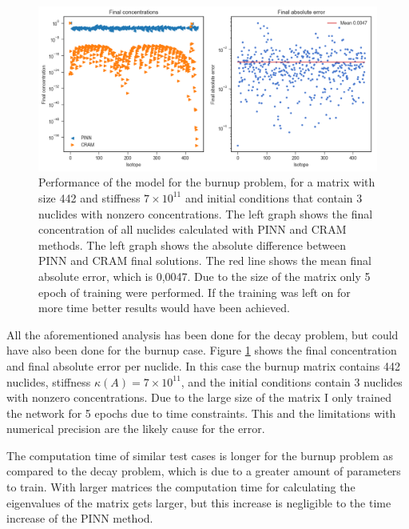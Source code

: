 \documentclass[10pt]{article}
\begin{document}
\begin{figure}[h]
    \centering
    \includegraphics[width = \textwidth]{burnup_over_time.png}
    \caption{Performance of the model for the burnup problem, for a matrix with size 442 and stiffness $7\times10^{11}$ and initial conditions that contain 3 nuclides with nonzero concentrations. The left graph shows the final concentration of all nuclides calculated with PINN and CRAM methods. The left graph shows the absolute difference between PINN and CRAM final solutions. The red line shows the mean final absolute error, which is 0,0047. Due to the size of the matrix only 5 epoch of training were performed. If the training was left on for more time better results would have been achieved.}
    \label{fig:burnup_case}
\end{figure}

All the aforementioned analysis has been done for the decay problem, but could have also been done for the burnup case. Figure \ref{fig:burnup_case} shows the final concentration and final absolute error per nuclide. In this case the burnup matrix contains 442 nuclides, stiffness $\kappa(A) = 7\times10^{11}$, and the initial conditions contain 3 nuclides with nonzero concentrations. Due to the large size of the matrix I only trained the network for 5 epochs due to time constraints. This and the limitations with numerical precision are the likely cause for the error.

The computation time of similar test cases is longer for the burnup problem as compared to the decay problem, which is due to a greater amount of parameters to train. With larger matrices the computation time for calculating the eigenvalues of the matrix gets larger, but this increase is negligible to the time increase of the PINN method.


\end{document}
